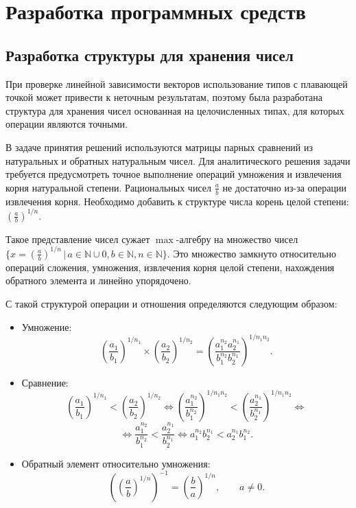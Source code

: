 \documentclass{spisok-article}
\begin{document}
    \section{Разработка программных средств}

    \subsection{Разработка структуры для хранения чисел}

    При проверке линейной зависимости векторов использование типов с плавающей точкой может привести к неточным результатам, поэтому была разработана структура для хранения чисел основанная на целочисленных типах, для которых операции являются точными.

    В задаче принятия решений используются матрицы парных сравнений из натуральных и обратных натуральным чисел.
    Для аналитического решения задачи требуется предусмотреть точное выполнение операций умножения и извлечения корня натуральной степени.
    Рациональных чисел $\displaystyle \frac{a}{b}$ не достаточно из-за операции извлечения корня. 
    Необходимо добавить к структуре числа корень целой степени:  $\displaystyle \left(\frac{a}{b}\right)^{1/n}$.
    
    Такое представление чисел сужает $\max$-алгебру на множество чисел $\Big\{x = \displaystyle \left(\frac{a}{b}\right)^{1/n} \, |\, a \in \mathbb{N} \cup 0, b \in \mathbb{N}, n \in \mathbb{N}\Big\}$. Это множество замкнуто относительно операций сложения, умножения, извлечения корня целой степени, нахождения обратного элемента и линейно упорядочено. 

    С такой структурой операции и отношения определяются следующим образом:
    \begin{itemize}
        \item Умножение:
        $$ \left(\frac{a_1}{b_1}\right)^{1/n_1} \times \left(\frac{a_2}{b_2}\right)^{1/n_2} = \left(\frac{a_1^{n_2}a_2^{n_1}}{b_1^{n_2}b_2^{n_1}}\right)^{1/n_1n_2}.$$
        \item Сравнение:
        $$ \left(\frac{a_1}{b_1}\right)^{1/n_1} < \left(\frac{a_2}{b_2}\right)^{1/n_2} \Leftrightarrow
        \left(\frac{a_1^{n_2}}{b_1^{n_2}}\right)^{1/n_1n_2} < \left(\frac{a_2^{n_1}}{b_2^{n_1}}\right)^{1/n_1n_2}\Leftrightarrow$$
        $$\Leftrightarrow
        \frac{a_1^{n_2}}{b_1^{n_2}} < \frac{a_2^{n_1}}{b_2^{n_1}}\Leftrightarrow
        {a_1^{n_2}}{b_2^{n_1}} < {a_2^{n_1}}{b_1^{n_2}}.$$
        \item Обратный элемент относительно умножения:
        $$ \left(\left(\frac{a}{b}\right)^{1/n}\right)^{-1} = \left(\frac{b}{a}\right)^{1/n}, \qquad a \neq 0.$$
    \end{itemize}
		
\end{document}
